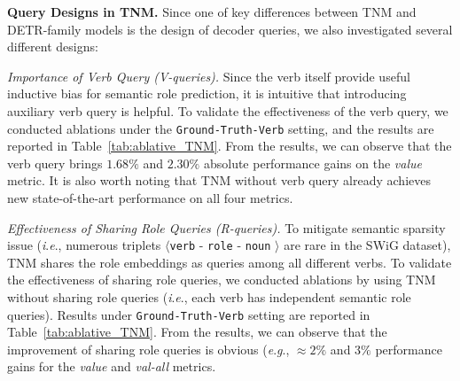 \documentclass[letterpaper]{article} %
\newcommand{\ie}{\textit{i}.\textit{e}.}
\newcommand{\eg}{\textit{e}.\textit{g}.}
\begin{document}
\noindent\textbf{Query Designs in TNM.} Since one of key differences between TNM and DETR-family models is the design of decoder queries, we also investigated several different designs:

\noindent\emph{Importance of Verb Query (V-queries).} Since the verb itself provide useful inductive bias for semantic role prediction, it is intuitive that introducing auxiliary verb query is helpful. To validate the effectiveness of the verb query, we conducted ablations under the \texttt{Ground-Truth-Verb} setting, and the results are reported in Table~\ref{tab:ablative_TNM}. From the results, we can observe that the verb query brings $1.68\%$ and $2.30\%$ absolute performance gains on the \emph{value} metric. It is also worth noting that TNM without verb query already achieves new state-of-the-art performance on all four metrics.


\noindent\emph{Effectiveness of Sharing Role Queries (R-queries).} To mitigate semantic sparsity issue (\ie, numerous triplets $\langle$\texttt{verb} - \texttt{role} - \texttt{noun} $\rangle$ are rare in the SWiG dataset), TNM shares the role embeddings as queries among all different verbs. To validate the effectiveness of sharing role queries, we conducted ablations by using TNM without sharing role queries (\ie, each verb has independent semantic role queries). Results under \texttt{Ground-Truth-Verb} setting are reported in Table~\ref{tab:ablative_TNM}. From the results, we can observe that the improvement of sharing role queries is obvious (\eg, $\approx 2\%$ and  $3\%$ performance gains for the \emph{value} and \emph{val-all} metrics.
\end{document}

